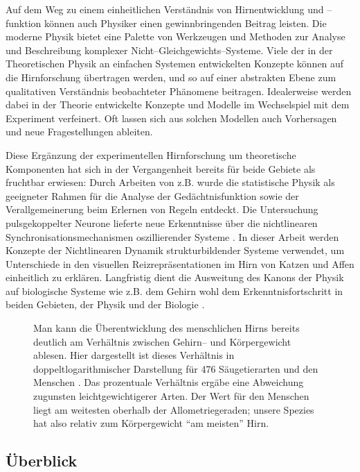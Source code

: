 Auf dem Weg zu einem einheitlichen Verständnis von Hirnentwicklung und
\mbox{--funktion} können auch Physiker einen gewinnbringenden Beitrag leisten.
Die moderne Physik bietet eine Palette von Werkzeugen und Methoden zur
Analyse und Beschreibung komplexer Nicht--Gleichgewichts--Systeme. Viele
der in der Theoretischen Physik an einfachen Systemen entwickelten Konzepte
können auf die Hirnforschung übertragen werden, und so auf einer
abstrakten Ebene zum qualitativen Verständnis beobachteter Phänomene
beitragen. Idealerweise werden dabei in der Theorie entwickelte Konzepte
und Modelle im Wechselspiel mit dem Experiment verfeinert. Oft lassen sich
aus solchen Modellen auch Vorhersagen und neue Fragestellungen ableiten.

Diese Ergänzung der experimentellen Hirnforschung um theoretische
Komponenten hat sich in der Vergangenheit bereits für beide Gebiete als
fruchtbar erwiesen: Durch Arbeiten von \textcite{hopfield:1982}
z.B. wurde die statistische Physik als geeigneter Rahmen für die Analyse
der Gedächtnisfunktion sowie der Verallgemeinerung beim Erlernen von
Regeln entdeckt. Die Untersuchung pulsgekoppelter Neurone lieferte neue
Erkenntnisse über die nichtlinearen Synchronisationsmechanismen
oszillierender Systeme \parencite[siehe z.B.][]{ernst95a}. In dieser
Arbeit werden Konzepte der Nichtlinearen Dynamik strukturbildender Systeme
verwendet, um Unterschiede in den visuellen Reizrepräsentationen im Hirn
von Katzen und Affen einheitlich zu erklären. Langfristig dient die
Ausweitung des Kanons der Physik auf biologische Systeme wie z.B. dem
Gehirn wohl dem Erkenntnisfortschritt in beiden Gebieten, der Physik und
der Biologie \parencite{braitenberg:1977}.

\begin{figure}[t]
    \centering
    \caption{Man kann die Überentwicklung des menschlichen Hirns bereits
    deutlich am Verhältnis zwischen Gehirn-- und Körpergewicht ablesen. Hier
    dargestellt ist dieses Verhältnis in doppeltlogarithmischer Darstellung
    für 476 Säugetierarten und den Menschen
        \parencite[aus][]{martin:1995}. Das prozentuale Verhältnis ergäbe
        eine Abweichung zugunsten leichtgewichtigerer Arten. Der Wert für den
        Menschen liegt am weitesten oberhalb der Allometriegeraden; unsere Spezies
        hat also relativ zum Körpergewicht ``am meisten'' Hirn.}
    \label{hirnmasse}
\end{figure}

\subsection{Überblick}

